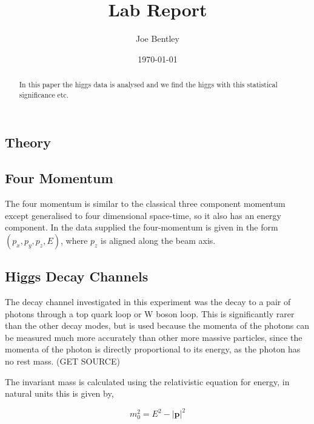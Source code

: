 \documentclass[11pt]{amsart}
\title{Lab Report}
\author{Joe Bentley}
\date{\today}
\begin{document}
\begin{abstract}
  In this paper the higgs data is analysed and we find the higgs with this statistical significance etc.
\end{abstract}

\maketitle

\newpage

\pagestyle{fancyplain}


\begin{multicols}{2}

\section{Theory}

\subsection{Four Momentum}

The four momentum is similar to the classical three component momentum except generalised to four dimensional space-time, so it also has an energy component. In the data supplied the four-momentum is given in the form $(p_x, p_y, p_z, E)$, where $p_z$ is aligned along the beam axis.

\subsection{Higgs Decay Channels}

The decay channel investigated in this experiment was the decay to a pair of photons through a top quark loop or W boson loop. This is significantly rarer than the other decay modes, but is used because the momenta of the photons can be measured much more accurately than other more massive particles, since the momenta of the photon is directly proportional to its energy, as the photon has no rest mass. (GET SOURCE)

The invariant mass is calculated using the relativistic equation for energy, in natural units this is given by,

\begin{equation}
  \label{eq:invariantmass}
  m_0^2 = E^2 - {|\mathbf{p}|}^2
\end{equation}


\end{multicols}
\end{document}
